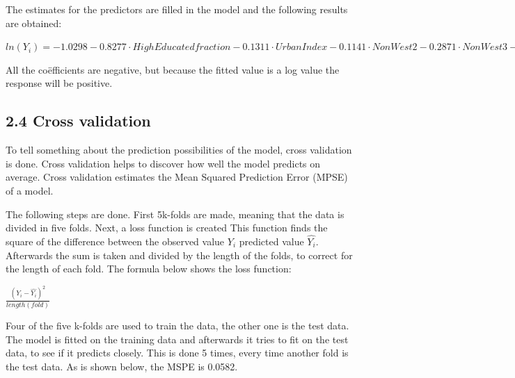 \documentclass[11pt,]{article}
\begin{document}
The estimates for the predictors are filled in the model and the
following results are obtained:

\(ln(Y_i) = -1.0298 -0.8277 \cdot High Educated fraction -0.1311 \cdot Urban Index -0.1141 \cdot Non West2 -0.2871 \cdot Non West3 -3.0168 \cdot Frac 60plus + \epsilon_i\)

All the coëfficients are negative, but because the fitted value is a log
value the response will be positive.

\subsection{2.4 Cross validation}\label{cross-validation}

To tell something about the prediction possibilities of the model, cross
validation is done. Cross validation helps to discover how well the
model predicts on average. Cross validation estimates the Mean Squared
Prediction Error (MPSE) of a model.

The following steps are done. First 5k-folds are made, meaning that the
data is divided in five folds. Next, a loss function is created This
function finds the square of the difference between the observed value
\(Y_i\) predicted value \(\widehat{Y_i}\). Afterwards the sum is taken
and divided by the length of the folds, to correct for the length of
each fold. The formula below shows the loss function:

\(\frac{(Y_i - \widehat{Y_i})^2}{length(fold)}\)

Four of the five k-folds are used to train the data, the other one is
the test data. The model is fitted on the training data and afterwards
it tries to fit on the test data, to see if it predicts closely. This is
done 5 times, every time another fold is the test data. As is shown
below, the MSPE is 0.0582.
\end{document}
